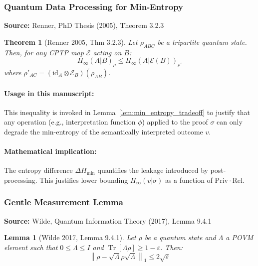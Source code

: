 \documentclass[preprint,12pt]{elsarticle}
\newtheorem{theorem}{Theorem}[section]
\newtheorem{lemma}{Lemma}[section]
\begin{document}
                \subsubsection{Quantum Data Processing for Min-Entropy}
                    \textbf{Source:} Renner, PhD Thesis (2005), Theorem 3.2.3

                    \begin{theorem}[Renner 2005, Thm 3.2.3]
                    Let $\rho_{ABC}$ be a tripartite quantum state. Then, for any CPTP map $\mathcal{E}$ acting on $B$:
                    \[
                    H_{\infty}(A|B)_{\rho} \leq H_{\infty}(A|\mathcal{E}(B))_{\rho'}
                    \]
                    where $\rho'_{AC} = (\mathrm{id}_A \otimes \mathcal{E}_B)(\rho_{AB})$.
                    \end{theorem}

                    \paragraph{Usage in this manuscript:}
                    This inequality is invoked in Lemma~\ref{lem:min_entropy_tradeoff} to justify that any operation (e.g., interpretation function $\phi$) applied to the proof $\sigma$ can only degrade the min-entropy of the semantically interpreted outcome $v$.

                    \paragraph{Mathematical implication:}
                    The entropy difference $\Delta H_{\text{min}}$ quantifies the leakage introduced by post-processing. This justifies lower bounding $H_\infty(v|\sigma)$ as a function of $\mathrm{Priv} \cdot \mathrm{Rel}$.

                \subsubsection{Gentle Measurement Lemma}
                    \textbf{Source:} Wilde, Quantum Information Theory (2017), Lemma 9.4.1

                    \begin{lemma}[Wilde 2017, Lemma 9.4.1]
                    Let $\rho$ be a quantum state and $\Lambda$ a POVM element such that $0 \leq \Lambda \leq I$ and $\operatorname{Tr}[\Lambda \rho] \geq 1 - \varepsilon$. Then:
                    \[
                    \left\| \rho - \sqrt{\Lambda} \rho \sqrt{\Lambda} \right\|_1 \leq 2\sqrt{\varepsilon}
                    \]
                    \end{lemma}
\end{document}
